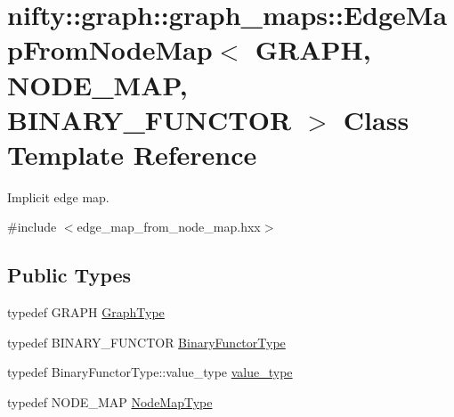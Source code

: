 \hypertarget{classnifty_1_1graph_1_1graph__maps_1_1EdgeMapFromNodeMap}{}\section{nifty\+:\+:graph\+:\+:graph\+\_\+maps\+:\+:Edge\+Map\+From\+Node\+Map$<$ G\+R\+A\+P\+H, N\+O\+D\+E\+\_\+\+M\+A\+P, B\+I\+N\+A\+R\+Y\+\_\+\+F\+U\+N\+C\+T\+O\+R $>$ Class Template Reference}
\label{classnifty_1_1graph_1_1graph__maps_1_1EdgeMapFromNodeMap}


Implicit edge map.  




{\ttfamily \#include $<$edge\+\_\+map\+\_\+from\+\_\+node\+\_\+map.\+hxx$>$}

\subsection*{Public Types}
\begin{DoxyCompactItemize}
\item 
typedef G\+R\+A\+P\+H \hyperlink{classnifty_1_1graph_1_1graph__maps_1_1EdgeMapFromNodeMap_a551dfc3ef2c5293f5306420d129da574}{Graph\+Type}
\item 
typedef B\+I\+N\+A\+R\+Y\+\_\+\+F\+U\+N\+C\+T\+O\+R \hyperlink{classnifty_1_1graph_1_1graph__maps_1_1EdgeMapFromNodeMap_a0fbb6e9a54ecf31d27e13db4f274a6d1}{Binary\+Functor\+Type}
\item 
typedef Binary\+Functor\+Type\+::value\+\_\+type \hyperlink{classnifty_1_1graph_1_1graph__maps_1_1EdgeMapFromNodeMap_abc24027c855755008ba3694cc49999c2}{value\+\_\+type}
\item 
typedef N\+O\+D\+E\+\_\+\+M\+A\+P \hyperlink{classnifty_1_1graph_1_1graph__maps_1_1EdgeMapFromNodeMap_ad2639421843e9da9afe18b0b35a7317e}{Node\+Map\+Type}
\end{DoxyCompactItemize}
